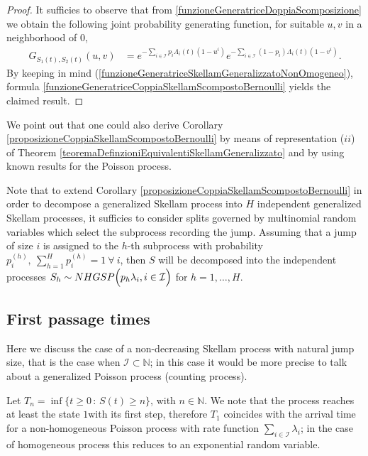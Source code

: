 \documentclass[12pt, twoside, english, headsepline]{article}
\theoremstyle{definition} %
\numberwithin{equation}{section} %
\begin{document}
\begin{proof}
It sufficies to observe that from \eqref{funzioneGeneratriceDoppiaScomposizione} we obtain the following joint probability generating function, for suitable $u,v$ in a neighborhood of $0$,
\begin{align}
G_{S_1(t),S_2(t)}(u,v)& = e^{-\sum_{i\in\mathcal{I}} p_i\Lambda_i(t)(1-u^i) }e^{-\sum_{i\in\mathcal{I}} (1-p_i)\Lambda_i(t)(1-v^i) }. \label{funzioneGeneratriceCoppiaSkellamScompostoBernoulli}
\end{align}
By keeping in mind (\ref{funzioneGeneratriceSkellamGeneralizzatoNonOmogeneo}), formula \eqref{funzioneGeneratriceCoppiaSkellamScompostoBernoulli} yields the claimed result.
\end{proof}

We point out that one could also derive Corollary \ref{proposizioneCoppiaSkellamScompostoBernoulli} by means of representation ($ii$) of Theorem \ref{teoremaDefinzioniEquivalentiSkellamGeneralizzato} and by using known results for the Poisson process.

Note that to extend Corollary \ref{proposizioneCoppiaSkellamScompostoBernoulli} in order to decompose a generalized Skellam process into $H$ independent generalized Skellam processes, it sufficies to consider splits governed by multinomial random variables which select the subprocess recording the jump. Assuming that a jump of size $i$ is assigned to the $h$-th subprocess with probability $p_i^{(h)},\ \sum_{h=1}^H p_i^{(h)} = 1\ \forall\ i$, then $S$ will be decomposed into the independent processes $S_h\sim NHGSP \Bigl(p_h\lambda_i, i\in \mathcal{I} \Bigr)$ for $h=1,\dots, H$.





\subsection{First passage times}\label{tempiPrimoPassaggioSkellamGeneralizzato}

Here we discuss the case of a non-decreasing Skellam process with natural jump size, that is the case when $\mathcal{I}\subset \mathbb{N}$; in this case it would be more precise to talk about a generalized Poisson process (counting process).

Let $T_n = \inf\{t\ge0\,:\,S(t)\ge n\}$, with $n\in\mathbb{N}$. We note that the process reaches at least the state $1$with its first step, therefore $T_1$ coincides with the arrival time for a non-homogeneous Poisson process with rate function $\sum_{i\in\mathcal{I}}\lambda_i$; in the case of homogeneous process this reduces to an exponential random variable. 
\end{document}
